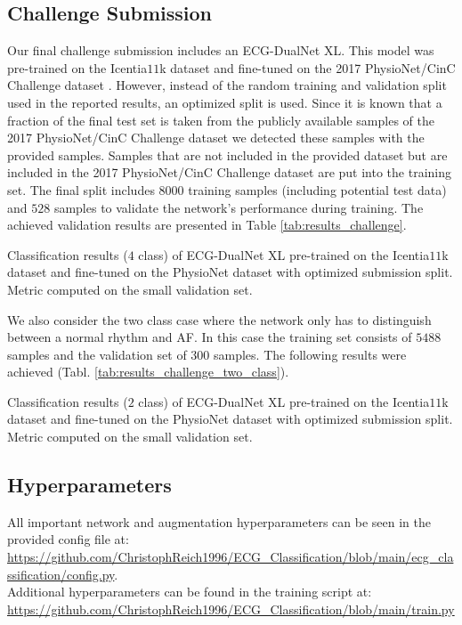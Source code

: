 \subsection{Challenge Submission} \label{subsec:challenge}

Our final challenge submission includes an ECG-DualNet XL. This model was pre-trained on the Icentia$11$k dataset \cite{Tan2019} and fine-tuned on the 2017 PhysioNet/CinC Challenge dataset \cite{Clifford2017}. However, instead of the random training and validation split used in the reported results, an optimized split is used. Since it is known that a fraction of the final test set is taken from the publicly available samples of the 2017 PhysioNet/CinC Challenge dataset we detected these samples with the provided samples. Samples that are not included in the provided dataset but are included in the 2017 PhysioNet/CinC Challenge dataset are put into the training set. The final split includes $8000$ training samples (including potential test data) and $528$ samples to validate the network's performance during training. The achieved validation results are presented in Table \ref{tab:results_challenge}.

\begin{table}[!ht]
    \centering
    \caption{Classification results ($4$ class) of ECG-DualNet XL pre-trained on the Icentia$11$k dataset and fine-tuned on the PhysioNet dataset with optimized submission split. Metric computed on the small validation set.}
    
    \label{tab:results_challenge}
\end{table}

We also consider the two class case where the network only has to distinguish between a normal rhythm and AF. In this case the training set consists of $5488$ samples and the validation set of $300$ samples. The following results were achieved (Tabl. \ref{tab:results_challenge_two_class}).

\begin{table}[!ht]
    \centering
    \caption{Classification results ($2$ class) of ECG-DualNet XL pre-trained on the Icentia$11$k dataset and fine-tuned on the PhysioNet dataset with optimized submission split. Metric computed on the small validation set.}
    
    \label{tab:results_challenge_two_class}
\end{table}

\subsection{Hyperparameters}\label{subsec:hyperparameters}

All important network and augmentation hyperparameters can be seen in the provided config file at: \url{https://github.com/ChristophReich1996/ECG_Classification/blob/main/ecg_classification/config.py}.\\
Additional hyperparameters can be found in the training script at: \url{https://github.com/ChristophReich1996/ECG_Classification/blob/main/train.py}